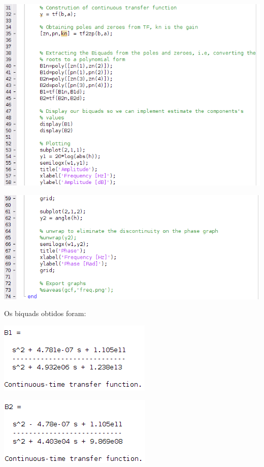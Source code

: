 \documentclass{article}
\begin{document}
\begin{center}
\centering
  \includegraphics[scale=0.8]{img/code2.png}
\end{center}

\begin{center}
\centering
  \includegraphics[scale=0.8]{img/code3.png}
\end{center}


Os biquads obtidos foram:
\begin{center}
\centering
  \includegraphics[scale=0.8]{img/biquad1.png}
\end{center}

\begin{center}
\centering
  \includegraphics[scale=0.8]{img/biquad2.png}
\end{center}
\end{document}

